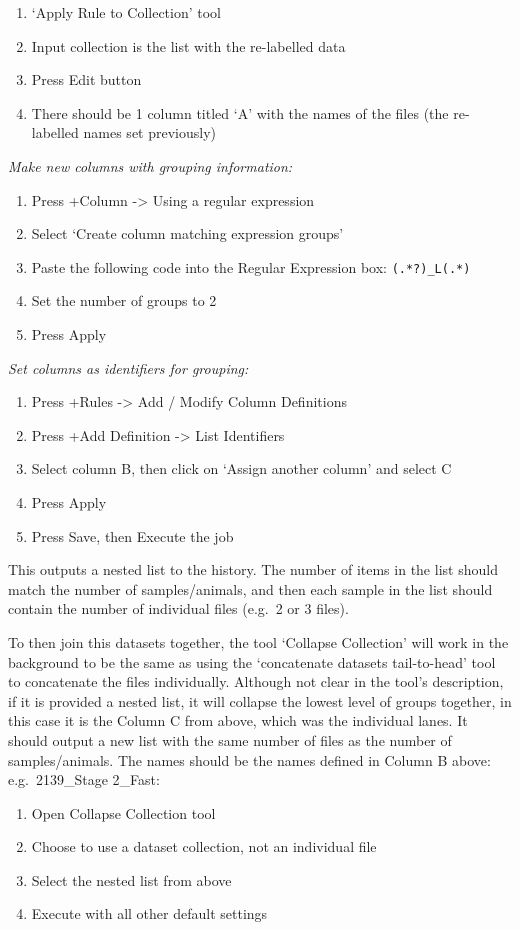\documentclass[
]{book}
\providecommand{\tightlist}{%
  \setlength{\itemsep}{0pt}\setlength{\parskip}{0pt}}
\begin{document}
\begin{enumerate}
\def\labelenumi{\arabic{enumi}.}
\tightlist
\item
  `Apply Rule to Collection' tool
\item
  Input collection is the list with the re-labelled data
\item
  Press Edit button
\item
  There should be 1 column titled `A' with the names of the files (the re-labelled names set previously)
\end{enumerate}

\emph{Make new columns with grouping information:}

\begin{enumerate}
\def\labelenumi{\arabic{enumi}.}
\setcounter{enumi}{4}
\tightlist
\item
  Press +Column -\textgreater{} Using a regular expression
\item
  Select `Create column matching expression groups'
\item
  Paste the following code into the Regular Expression box: \texttt{(.*?)\_L(.*)}
\item
  Set the number of groups to 2
\item
  Press Apply
\end{enumerate}

\emph{Set columns as identifiers for grouping:}

\begin{enumerate}
\def\labelenumi{\arabic{enumi}.}
\setcounter{enumi}{9}
\tightlist
\item
  Press +Rules -\textgreater{} Add / Modify Column Definitions
\item
  Press +Add Definition -\textgreater{} List Identifiers
\item
  Select column B, then click on `Assign another column' and select C
\item
  Press Apply
\item
  Press Save, then Execute the job
\end{enumerate}

This outputs a nested list to the history. The number of items in the list should match the number of samples/animals, and then each sample in the list should contain the number of individual files (e.g.~2 or 3 files).

To then join this datasets together, the tool `Collapse Collection' will work in the background to be the same as using the `concatenate datasets tail-to-head' tool to concatenate the files individually. Although not clear in the tool's description, if it is provided a nested list, it will collapse the lowest level of groups together, in this case it is the Column C from above, which was the individual lanes. It should output a new list with the same number of files as the number of samples/animals. The names should be the names defined in Column B above: e.g.~2139\_Stage 2\_Fast:

\begin{enumerate}
\def\labelenumi{\arabic{enumi}.}
\tightlist
\item
  Open Collapse Collection tool
\item
  Choose to use a dataset collection, not an individual file
\item
  Select the nested list from above
\item
  Execute with all other default settings
\end{enumerate}
\end{document}

